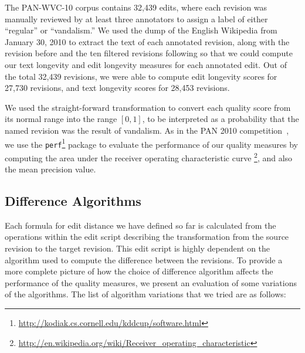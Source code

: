 The PAN-WVC-10 corpus contains 32,439 edits, where each revision was
manually reviewed by at least three annotators to assign a label
of either ``regular'' or ``vandalism.''
We used the dump of the English Wikipedia from January 30, 2010
to extract the text of each annotated revision, along with the revision
before and the ten filtered revisions following so that we could compute
our text longevity and edit longevity measures for each annotated edit.
Out of the total 32,439 revisions, we were able to compute
edit longevity scores for 27,730 revisions, and text longevity
scores for 28,453 revisions.

We used the straight-forward transformation to convert
each quality score from its normal range into the range
$[0,1]$, to be interpreted as a probability that the named
revision was the result of vandalism.
As in the PAN 2010 competition~\cite{Potthast2010b}, we use the
\texttt{perf}\footnote{\url{http://kodiak.cs.cornell.edu/kddcup/software.html}}
package to evaluate the performance of our quality measures
by computing the area under the receiver operating characteristic
curve \footnote{\url{http://en.wikipedia.org/wiki/Receiver_operating_characteristic}},
and also the mean precision value.

\subsection{Difference Algorithms}

Each formula for edit distance we have defined so far is calculated
from the operations within the edit script describing the transformation
from the source revision to the target revision.
This edit script is highly dependent on the algorithm used to
compute the difference between the revisions.
To provide a more complete picture of how the choice of difference
algorithm affects the performance of the quality measures,
we present an evaluation of some variations of the algorithms.
The list of algorithm variations that we tried are as follows:

